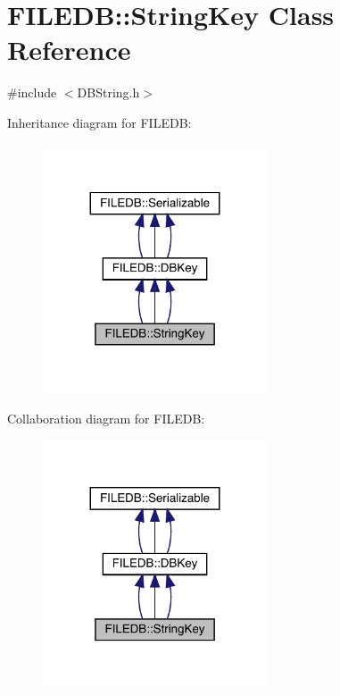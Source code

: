 \hypertarget{classFILEDB_1_1StringKey}{}\section{F\+I\+L\+E\+DB\+:\+:String\+Key Class Reference}
\label{classFILEDB_1_1StringKey}


{\ttfamily \#include $<$D\+B\+String.\+h$>$}



Inheritance diagram for F\+I\+L\+E\+DB\+:
\nopagebreak
\begin{figure}[H]
\begin{center}
\leavevmode
\includegraphics[width=188pt]{df/dc2/classFILEDB_1_1StringKey__inherit__graph}
\end{center}
\end{figure}


Collaboration diagram for F\+I\+L\+E\+DB\+:
\nopagebreak
\begin{figure}[H]
\begin{center}
\leavevmode
\includegraphics[width=188pt]{df/d4b/classFILEDB_1_1StringKey__coll__graph}
\end{center}
\end{figure}
